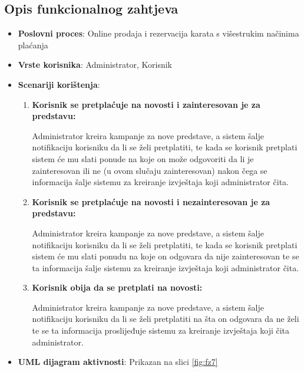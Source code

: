 \subsection{Opis funkcionalnog zahtjeva}  
\begin{itemize}  
    \item \textbf{Poslovni proces}: Online prodaja i rezervacija karata s višestrukim načinima plaćanja 
    \item \textbf{Vrste korisnika}: Administrator, Korisnik
    \item \textbf{Scenariji korištenja}:  
        \begin{enumerate}  
            \item \textbf{Korisnik se pretplaćuje na novosti i zainteresovan je za predstavu:} 

            Administrator kreira kampanje za nove predstave, a sistem šalje notifikaciju korisniku da li se želi pretplatiti, te kada se korisnik pretplati sistem će mu slati ponude na koje on može odgovoriti da li je zainteresovan ili ne (u ovom slučaju zainteresovan) nakon čega se informacija šalje sistemu za kreiranje izvještaja koji administrator čita.
            
            \item \textbf{Korisnik se pretplaćuje na novosti i nezainteresovan je za predstavu:} 

	    Administrator kreira kampanje za nove predstave, a sistem šalje notifikaciju korisniku da li se želi pretplatiti, te kada se korisnik pretplati sistem će mu slati ponudu na koje on odgovara da nije zainteresovan te se ta informacija šalje sistemu za kreiranje izvještaja koji administrator čita.            

            \item \textbf{Korisnik obija da se pretplati na novosti:} 

            Administrator kreira kampanje za nove predstave, a sistem šalje notifikaciju korisniku da li se želi pretplatiti na šta on odgovara da ne želi te se ta informacija proslijeđuje sistemu za kreiranje izvještaja koji čita administrator.  
        \end{enumerate}
    \item \textbf{UML dijagram aktivnosti}: Prikazan na slici \ref{fig:fz7}  
\end{itemize}  
